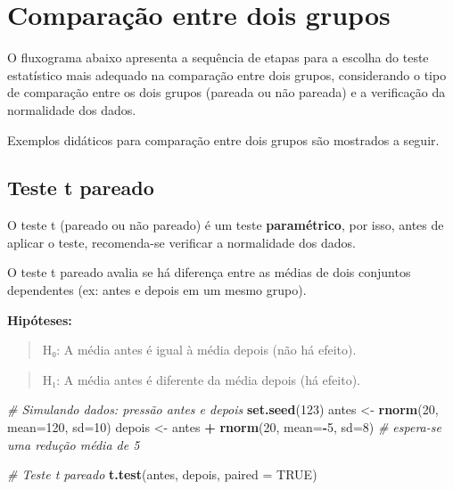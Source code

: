 \documentclass[
]{book}
\newenvironment{Shaded}{\begin{snugshade}}{\end{snugshade}}
\newcommand{\AttributeTok}[1]{\textcolor[rgb]{0.13,0.29,0.53}{#1}}
\newcommand{\CommentTok}[1]{\textcolor[rgb]{0.56,0.35,0.01}{\textit{#1}}}
\newcommand{\ConstantTok}[1]{\textcolor[rgb]{0.56,0.35,0.01}{#1}}
\newcommand{\DecValTok}[1]{\textcolor[rgb]{0.00,0.00,0.81}{#1}}
\newcommand{\FunctionTok}[1]{\textcolor[rgb]{0.13,0.29,0.53}{\textbf{#1}}}
\newcommand{\NormalTok}[1]{#1}
\newcommand{\OtherTok}[1]{\textcolor[rgb]{0.56,0.35,0.01}{#1}}
\newcommand{\SpecialCharTok}[1]{\textcolor[rgb]{0.81,0.36,0.00}{\textbf{#1}}}
\begin{document}
\chapter{Comparação entre dois grupos}\label{comparauxe7uxe3o-entre-dois-grupos}

O fluxograma abaixo apresenta a sequência de etapas para a escolha do teste estatístico mais adequado na comparação entre dois grupos, considerando o tipo de comparação entre os dois grupos (pareada ou não pareada) e a verificação da normalidade dos dados.

Exemplos didáticos para comparação entre dois grupos são mostrados a seguir.

\section{Teste t pareado}\label{teste-t-pareado}

O teste t (pareado ou não pareado) é um teste \textbf{paramétrico}, por isso, antes de aplicar o teste, recomenda-se verificar a normalidade dos dados.

O teste t pareado avalia se há diferença entre as médias de dois conjuntos dependentes (ex: antes e depois em um mesmo grupo).

\textbf{Hipóteses:}

\begin{quote}
H₀: A média antes é igual à média depois (não há efeito).
\end{quote}

\begin{quote}
H₁: A média antes é diferente da média depois (há efeito).
\end{quote}

\begin{Shaded}
\begin{Highlighting}[]
\CommentTok{\# Simulando dados: pressão antes e depois}
\FunctionTok{set.seed}\NormalTok{(}\DecValTok{123}\NormalTok{)}
\NormalTok{antes }\OtherTok{\textless{}{-}} \FunctionTok{rnorm}\NormalTok{(}\DecValTok{20}\NormalTok{, }\AttributeTok{mean=}\DecValTok{120}\NormalTok{, }\AttributeTok{sd=}\DecValTok{10}\NormalTok{)}
\NormalTok{depois }\OtherTok{\textless{}{-}}\NormalTok{ antes }\SpecialCharTok{+} \FunctionTok{rnorm}\NormalTok{(}\DecValTok{20}\NormalTok{, }\AttributeTok{mean=}\SpecialCharTok{{-}}\DecValTok{5}\NormalTok{, }\AttributeTok{sd=}\DecValTok{8}\NormalTok{) }\CommentTok{\# espera{-}se uma redução média de 5}

\CommentTok{\# Teste t pareado}
\FunctionTok{t.test}\NormalTok{(antes, depois, }\AttributeTok{paired =} \ConstantTok{TRUE}\NormalTok{)}
\end{Highlighting}
\end{Shaded}
\end{document}
